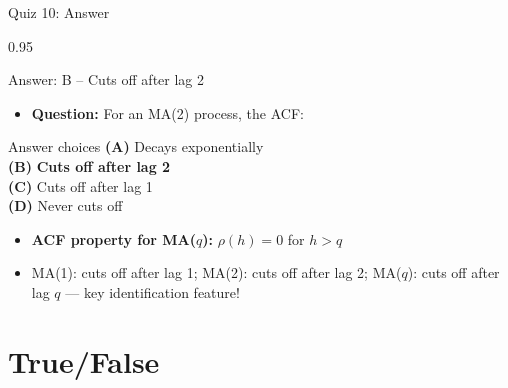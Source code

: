 \documentclass[9pt, aspectratio=169, t]{beamer}
\begin{document}
\begin{frame}{Quiz 10: Answer}
    \begin{cminipage}{0.95\textwidth}
    \begin{exampleblock}{Answer: B -- Cuts off after lag 2}
        \begin{itemize}\setlength{\itemsep}{0pt}
            \item \textbf{Question:} For an MA(2) process, the ACF:
        \end{itemize}

        \vspace{0.3cm}

    \begin{block}{Answer choices}
        \textcolor{MainBlue}{\textbf{(A)}} Decays exponentially \incorrect\\[3pt]
        \textcolor{MainBlue}{\textbf{(B)}} \textbf{\textcolor{Forest}{Cuts off after lag 2}} \correct\\[3pt]
        \textcolor{MainBlue}{\textbf{(C)}} Cuts off after lag 1 \incorrect\\[3pt]
        \textcolor{MainBlue}{\textbf{(D)}} Never cuts off \incorrect
    \end{block}

        \vspace{0.3cm}

        \begin{itemize}
            \item \textbf{ACF property for MA($q$):} $\rho(h) = 0$ for $h > q$
            \item MA(1): cuts off after lag 1; MA(2): cuts off after lag 2; MA($q$): cuts off after lag $q$ --- key identification feature!
        \end{itemize}
    \end{exampleblock}

    \end{cminipage}
\end{frame}

\section{True/False}
\end{document}
